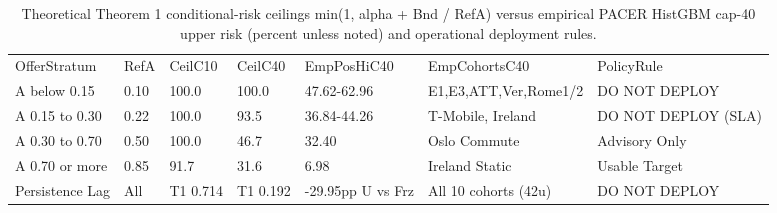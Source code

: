 \begin{table}[!ht]
\centering\footnotesize\setlength{\tabcolsep}{3.5pt}
\caption{Theoretical Theorem 1 conditional-risk ceilings min(1, alpha + Bnd / RefA) versus empirical PACER HistGBM cap-40 upper risk (percent unless noted) and operational deployment rules.}
\begin{tabular}{lllllll}
\hline
OfferStratum & RefA & CeilC10 & CeilC40 & EmpPosHiC40 & EmpCohortsC40 & PolicyRule \\
A below 0.15 & 0.10 & 100.0 & 100.0 & 47.62-62.96 & E1,E3,ATT,Ver,Rome1/2 & DO NOT DEPLOY \\
A 0.15 to 0.30 & 0.22 & 100.0 & 93.5 & 36.84-44.26 & T-Mobile, Ireland & DO NOT DEPLOY (SLA) \\
A 0.30 to 0.70 & 0.50 & 100.0 & 46.7 & 32.40 & Oslo Commute & Advisory Only \\
A 0.70 or more & 0.85 & 91.7 & 31.6 & 6.98 & Ireland Static & Usable Target \\
Persistence Lag & All & T1 0.714 & T1 0.192 & -29.95pp U vs Frz & All 10 cohorts (42u) & DO NOT DEPLOY \\
\hline
\end{tabular}
\end{table}
